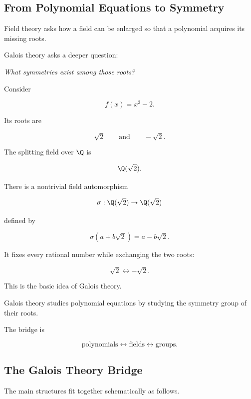 \subsection{From Polynomial Equations to Symmetry}
\label{subsec:galois-polynomial-symmetry}

Field theory asks how a field can be enlarged so that a polynomial acquires
its missing roots.

Galois theory asks a deeper question:

\begin{center}
\emph{What symmetries exist among those roots?}
\end{center}

Consider

\[ f(x)=x^2-2. \]

Its roots are

\[ \sqrt2\qquad\text{and}\qquad-\sqrt2. \]

The splitting field over \(\Q\) is

\[ \Q(\sqrt2). \]

There is a nontrivial field automorphism

\[ \sigma:\Q(\sqrt2)\to\Q(\sqrt2) \]

defined by

\[ \sigma(a+b\sqrt2)=a-b\sqrt2. \]

It fixes every rational number while exchanging the two roots:

\[ \sqrt2\longleftrightarrow-\sqrt2. \]

This is the basic idea of Galois theory.

\begin{conceptbox}
Galois theory studies polynomial equations by studying the symmetry group of
their roots.

The bridge is

\[ \boxed{\text{polynomials}\longleftrightarrow\text{fields}\longleftrightarrow\text{groups}}. \]
\end{conceptbox}

\subsection{The Galois Theory Bridge}
\label{subsec:galois-bridge}

The main structures fit together schematically as follows.

